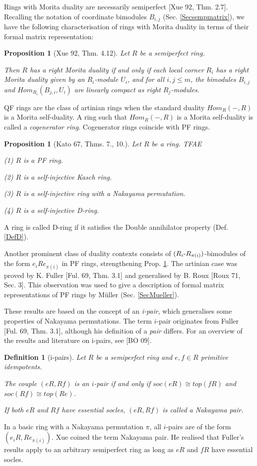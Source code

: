 \documentclass[11pt]{article}
\theoremstyle{plain}
\newtheorem{Prop}[veta]{Proposition}
\newtheorem{Def}[veta]{Definition}
\theoremstyle{remark}
\theoremstyle{plain}
\begin{document}
Rings with Morita duality are necessarily semiperfect [Xue 92, Thm. 2.7]. Recalling the notation of coordinate bimodules $B_{i,j}$ (Sec. \ref{Secsempmatrix}), we have the following characterisation of rings with Morita duality in terms of their formal matrix representation: 
\begin{Prop}[Xue 92, Thm. 4.12]\label{PropDuality}
Let $R$ be a semiperfect ring.

Then $R$ has a right Morita duality if and only if each local corner $R_i$ has a right Morita duality given by an $R_i$-module $U_i$, and for all $i, j\leq m$, the bimodules $B_{i,j}$ and $Hom_{R_i}(B_{j,i}, U_i)$ are linearly compact as right $R_j$-modules.    
\end{Prop}





QF rings are the class of artinian rings when the standard duality $Hom_R(-, R)$ is a Morita self-duality. A ring such that $Hom_R(-,R)$ is a Morita self-duality is called a \textit{cogenerator ring}. Cogenerator rings coincide with PF rings.

\begin{Prop}[Kato 67, Thms. 7.,  10.]\label{PropKato}
 Let $R$ be a ring. TFAE

 (1) $R$ is a PF ring.

 (2) $R$ is a self-injective Kasch ring.

 (3) $R$ is a self-injective ring with a Nakayama permutation.

 (4) $R$ is a self-injective D-ring. 
\end{Prop}
A ring is called D-ring if it satisfies the Double annihilator property (Def. \ref{DefD}).


Another prominent class of duality contexts consists of $(R_i\text-R_{\pi(i)})$-bimodules of the form $e_iRe_{\pi(i)}$ in PF rings, strengthening Prop. \ref{PropDuality}. The artinian case was proved by K. Fuller [Ful. 69, Thm. 3.1] and generalised by B. Roux [Roux 71, Sec. 3]. This observation was used to give a description of formal matrix representations of PF rings by Müller (Sec. \ref{SecMueller}).

These results are based on the concept of an \textit{i-pair}, which generalises some properties of Nakayama permutations. The term $i$-pair originates from Fuller [Ful. 69, Thm. 3.1], although his definition of a \textit{pair} differs. For an overview of the results and literature on i-pairs, see [BO 09]. 

\begin{Def}[i-pairs]
Let $R$ be a semiperfect ring and $e, f\in R$ primitive idempotents.

The couple  $(eR, Rf)$ is an \emph{$i$-pair} if and only if $soc(eR)\cong top(fR)$ and $soc(Rf)\cong top(Re)$.

If both $eR$ and $Rf$ have essential socles, $(eR, Rf)$ is called a \emph{Nakayama pair}.
\end{Def}
 In a basic ring with a Nakayama permutation $\pi$, all $i$-pairs are of the form $(e_iR, Re_{\pi(i)})$. Xue coined the term Nakayama pair. He realised that Fuller's results apply to an arbitrary semiperfect ring as long as $eR$ and $fR$ have essential socles.
\end{document}
